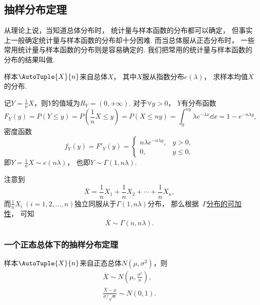 \subsection{抽样分布定理}
从理论上说，当知道总体分布时，
统计量与样本函数的分布都可以确定，
但事实上一般确定统计量与样本函数的分布却十分困难.
而当总体服从正态分布时，
一些常用统计量与样本函数的分布则是容易确定的.
我们把常用的统计量与样本函数的分布的结果叫做.

\begin{example}
样本\(\AutoTuple{X}{n}\)来自总体\(X\)，
其中\(X\)服从指数分布\(e(\lambda)\)，
求样本均值\(\overline{X}\)的分布.
\begin{solution}
记\(Y = \frac1n X\)，则\(Y\)的值域为\(R_Y = (0,+\infty)\).
对于\(\forall y>0\)，
\(Y\)有分布函数\[
	F_Y(y) = P(Y \leq y)
	= P\left(\frac1n X \leq y\right)
	= P(X \leq ny)
	= \int_0^{ny} \lambda e^{-\lambda x} \dd{x}
	= 1 - e^{-n\lambda y},
\]
密度函数\[
	f_Y(y) = F'_Y(y) = \left\{ \begin{array}{lc}
		n\lambda e^{-n\lambda y}, & y>0, \\
		0, & y \leq 0,
	\end{array} \right.
\]
即\(Y=\frac1nX \sim e(n\lambda)\)，
也即\(Y \sim \Gamma(1,n\lambda)\).

注意到\[
	\overline{X} = \frac1n X_1 + \frac1n X_2 + \dotsb + \frac1n X_n,
\]
而\(\frac1n X_i\ (i=1,2,\dotsc,n)\)独立同服从于\(\Gamma(1,n\lambda)\)分布，
那么根据~\hyperref[theorem:多维随机变量及其分布.伽马分布的可加性1]{\(\Gamma\)分布的可加性}，
可知\[
	\overline{X} \sim \Gamma(n,n\lambda).
\]
\end{solution}
\end{example}

\subsubsection{一个正态总体下的抽样分布定理}
\begin{theorem}
样本\(\AutoTuple{X}{n}\)来自正态总体\(N(\mu,\sigma^2)\)，则\begin{gather}
	\label{equation:抽样分布定理.一个正态总体的抽样分布1}
	\overline{X} \sim N\left(\mu,\frac{\sigma^2}{n}\right), \\
	\label{equation:抽样分布定理.一个正态总体的抽样分布2}
	\frac{\overline{X}-\mu}{\sigma / \sqrt{n}} \sim N(0,1).
\end{gather}

\end{theorem}

